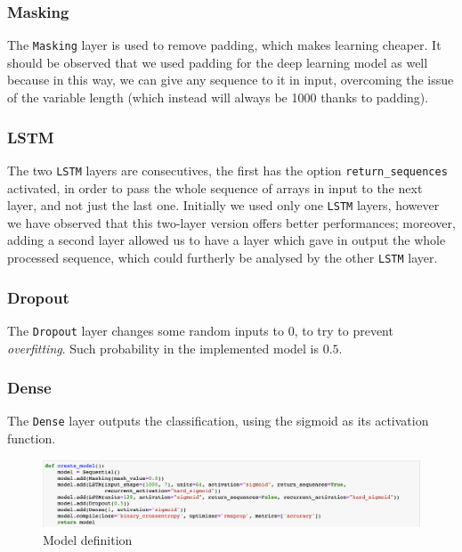 \documentclass[8pt,notitlepage]{report}
\begin{document}
				\subsubsection{Masking}
					The \verb|Masking| layer is used to remove padding, which makes learning cheaper. It should be observed that we used padding for the deep learning model as well because in this way, we can give any sequence to it in input, overcoming the issue of the variable length (which instead will always be 1000 thanks to padding).
					
				\subsubsection{LSTM}
					The two \verb|LSTM| layers are consecutives, the first has the option \verb|return_sequences| activated, in order to pass the whole sequence of arrays in input to the next layer, and not just the last one. Initially we used only one \verb|LSTM| layers, however we have observed that this two-layer version offers better performances; moreover, adding a second layer allowed us to have a layer which gave in output the whole processed sequence, which could furtherly be analysed by the other \verb|LSTM| layer.
					
				\subsubsection{Dropout}
					The \verb|Dropout| layer changes some random inputs to $ 0 $, to try to prevent \textit{overfitting}. Such probability in the implemented model is $ 0.5 $.
					
				\subsubsection{Dense}
					The \verb|Dense| layer outputs the classification, using the sigmoid as its activation function.					
			
	
			\begin{figure}
				\begin{center}
					\includegraphics[scale=.45]{def_model}
					\caption{Model definition}
					\label{fig:model}
				\end{center}
			\end{figure}					
					
\end{document}
